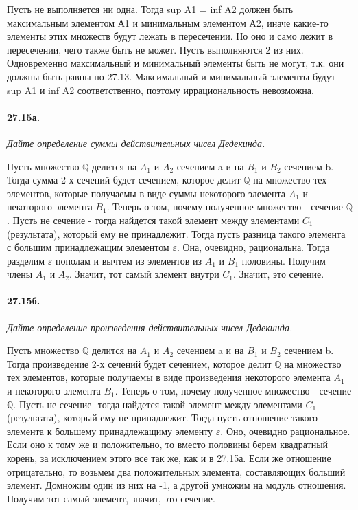 \documentclass{book}
\begin{document}
Пусть не выполняется ни одна. Тогда sup A1 = inf A2 должен быть максимальным элементом А1 и минимальным элементом А2, иначе какие-то элементы этих множеств будут лежать в пересечении. Но оно и само лежит в пересечении, чего также быть не может.
Пусть выполняются 2 из них. Одновременно максимальный и минимальный элементы быть не могут, т.к. они должны быть равны по 27.13. Максимальный и минимальный элементы будут sup A1 и inf A2 соответственно, поэтому иррациональность невозможна. 

\paragraph{27.15а.}
\textit{Дайте определение суммы действительных чисел Дедекинда.}

Пусть множество $\mathbb{Q}$ делится на $A_1$ и $A_2$ сечением a и на $B_1$ и $B_2$ сечением b. Тогда сумма 2-х сечений будет сечением, которое делит $\mathbb{Q}$ на множество тех элементов, которые получаемы в виде суммы некоторого элемента $A_1$ и некоторого элемента $B_1$. Теперь о том, почему полученное множество - сечение $\mathbb{Q}$. Пусть не сечение - тогда найдется такой элемент между элементами $C_1$ (результата), который ему не принадлежит. Тогда пусть разница такого элемента с большим принадлежащим элементом $\varepsilon$. Она, очевидно, рациональна. Тогда разделим $\varepsilon$ пополам и вычтем из элементов из $A_1$ и $B_1$ половины. Получим члены $A_1$ и $A_2$. Значит, тот самый элемент внутри $C_1$. Значит, это сечение.

\paragraph{27.15б.}
\textit{Дайте определение произведения действительных чисел Дедекинда.}

Пусть множество $\mathbb{Q}$ делится на $A_1$ и $A_2$ сечением a и на $B_1$ и $B_2$ сечением b. Тогда произведение 2-х сечений будет сечением, которое делит $\mathbb{Q}$ на множество тех элементов, которые получаемы в виде произведения некоторого элемента $A_1$ и некоторого элемента $B_1$. Теперь о том, почему полученное множество - сечение $\mathbb{Q}$. Пусть не сечение -тогда найдется такой элемент между элементами $C_1$ (результата), который ему не принадлежит. Тогда пусть отношение такого элемента к большему принадлежащиму элементу $\varepsilon$. Оно, очевидно рациональное. Если оно к тому же и положительно, то вместо половины берем квадратный корень, за исключением этого все так же, как и в 27.15а. Если же отношение отрицательно, то возьмем два положительных элемента, составляющих больший элемент. Домножим один из них на -1, а другой умножим на модуль отношения. Получим тот самый элемент, значит, это сечение.
\end{document}
